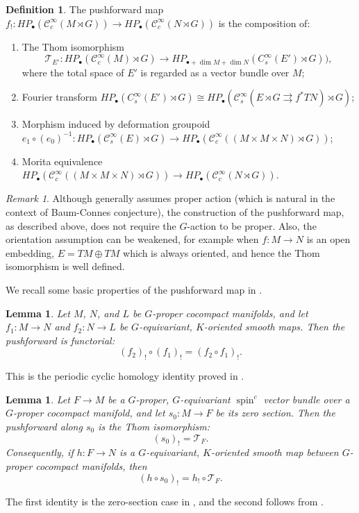 \documentclass[a4paper]{amsart}
\newcommand{\maC}{\mathcal C}
\newcommand{\maT}{\mathcal T}
\newcommand\<{\langle}
\renewcommand\>{\rangle}
\newtheorem{lem}[theorem]{Lemma}
\theoremstyle{definition}
\newtheorem{dfn}[theorem]{Definition}
\theoremstyle{remark}
\newtheorem{rem}[theorem]{Remark}
\begin{document}
\begin{dfn}
\label{Pushforward}
The pushforward map $f_! : H P _\bullet (\maC^\infty _c (M \rtimes G)) \to H P _\bullet (\maC^\infty _c (N \rtimes G))$
is the composition of:
\begin{enumerate}
\item
The Thom isomorphism
$$\maT _{E'} : H P _\bullet (\maC^\infty _c (M) \rtimes G)
\to H P _{\bullet + \dim M + \dim N} (C^\infty _s (E') \rtimes G)),$$
where the total space of $E'$ is regarded as a vector bundle over $M$;
\item
Fourier transform $H P _\bullet (C^\infty _s (E') \rtimes G)
\cong H P _\bullet (\maC^\infty _s (E \rtimes G \rightrightarrows f ^* T N) \rtimes G)$;
\item
Morphism induced by deformation groupoid
$e_1 \circ (e_0)^{-1} : H P _\bullet (\maC^\infty _s (E) \rtimes G) \to H P _\bullet (\maC^\infty _c ((M \times M \times N) \rtimes G))$;
\item
Morita equivalence
$H P _\bullet (\maC^\infty _c ((M \times M \times N) \rtimes G)) \to H P _\bullet (\maC^\infty _c (N \rtimes G))$.
\end{enumerate}
\end{dfn}

\begin{rem}
\label{NonProper}
Although \cite{CRWW23} generally assumes proper action (which is natural in the context of Baum-Connes conjecture),
the construction of the pushforward map, as described above, does not require the $G$-action to be proper.
Also, the orientation assumption can be weakened,
for example when $f: M \to N$ is an open embedding, $E = T M \oplus T M$ which is always oriented,
and hence the Thom isomorphism is well defined.
\end{rem}


We recall some basic properties of the pushforward map in \cite{CRWW23}.

\begin{lem}
\label{PushLem1}
Let $M$, $N$, and $L$ be $G$-proper cocompact manifolds, and let
$f_1:M\to N$ and $f_2:N\to L$ be $G$-equivariant, $K$-oriented smooth maps.
Then the pushforward is functorial:
$$ (f_2)_! \circ (f_1)_! = (f_2 \circ f_1)_! .$$
\end{lem}
This is the periodic cyclic homology identity proved in
\cite[Theorem 4.1, Equation (4.7)]{CRWW23}.

\begin{lem}
Let $F\to M$ be a $G$-proper, $G$-equivariant $\operatorname{spin}^c$ vector bundle
over a $G$-proper cocompact manifold, and let $s_0:M\to F$ be its zero section.
Then the pushforward along $s_0$ is the Thom isomorphism:
$$ (s_0)_! = \maT_F .$$
Consequently, if $h:F\to N$ is a $G$-equivariant, $K$-oriented smooth map
between $G$-proper cocompact manifolds, then
$$ (h\circ s_0)_! = h_!\circ \maT_F .$$
\end{lem}
The first identity is the zero-section case in \cite[Section 3.1]{CRWW23},
and the second follows from \cite[Theorem 4.1]{CRWW23}.
\end{document}

